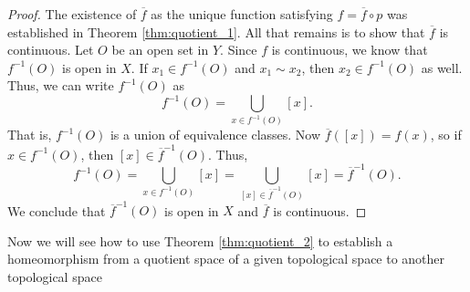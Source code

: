 \begin{proof} The existence of $\overline{f}$ as the unique function satisfying $f = \overline{f} \circ p$ was established in Theorem \ref{thm:quotient_1}. All that remains is to show that $\overline{f}$ is continuous. Let $O$ be an open set in $Y$. Since $f$ is continuous, we know that $f^{-1}(O)$ is open in $X$. If $x_1 \in f^{-1}(O)$ and $x_1 \sim x_2$, then $x_2 \in f^{-1}(O)$ as well. Thus, we can write $f^{-1}(O)$ as
\[f^{-1}(O) = \bigcup_{x \in f^{-1}(O)} [x].\]
That is, $f^{-1}(O)$ is a union of equivalence classes. Now $\overline{f}([x]) = f(x)$, so if $x \in f^{-1}(O)$, then $[x] \in \overline{f}^{-1}(O)$. Thus,
\[f^{-1}(O) = \bigcup_{x \in f^{-1}(O)} [x] = \bigcup_{[x] \in \overline{f}^{-1}(O)} [x] = \overline{f}^{-1}(O).\]
We conclude that $\overline{f}^{-1}(O)$ is open in $X$ and $\overline{f}$ is continuous. 
\end{proof}

Now we will see how to use Theorem \ref{thm:quotient_2} to establish a homeomorphism from a quotient space of a given topological space to another topological space

